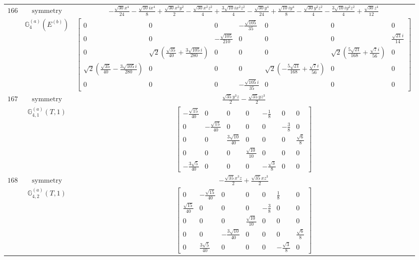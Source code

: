 \documentclass[fleqn,8pt,landscape]{jsarticle}
\begin{document}
\begin{longtable}{ccc}
$ 166 $ & $ \text{symmetry} $ & $ - \frac{\sqrt{30} x^{4}}{24} - \frac{\sqrt{10} i x^{4}}{8} + \frac{\sqrt{30} x^{2} y^{2}}{2} - \frac{\sqrt{30} x^{2} z^{2}}{4} + \frac{3 \sqrt{10} i x^{2} z^{2}}{4} - \frac{\sqrt{30} y^{4}}{24} + \frac{\sqrt{10} i y^{4}}{8} - \frac{\sqrt{30} y^{2} z^{2}}{4} - \frac{3 \sqrt{10} i y^{2} z^{2}}{4} + \frac{\sqrt{30} z^{4}}{12} $ \\
$  $ & $ \mathbb{G}_{4}^{(a)}(E^{(b)}) $ & $ \begin{bmatrix} 0 & 0 & 0 & - \frac{\sqrt{105}}{35} & 0 & 0 & 0 \\ 0 & 0 & - \frac{\sqrt{105}}{210} & 0 & 0 & 0 & \frac{\sqrt{21} i}{14} \\ 0 & \sqrt{2} \left(\frac{\sqrt{35}}{40} + \frac{3 \sqrt{105} i}{280}\right) & 0 & 0 & 0 & \sqrt{2} \left(\frac{5 \sqrt{21}}{168} + \frac{\sqrt{7} i}{56}\right) & 0 \\ \sqrt{2} \left(\frac{\sqrt{35}}{40} - \frac{3 \sqrt{105} i}{280}\right) & 0 & 0 & 0 & \sqrt{2} \left(- \frac{5 \sqrt{21}}{168} + \frac{\sqrt{7} i}{56}\right) & 0 & 0 \\ 0 & 0 & 0 & - \frac{\sqrt{105} i}{35} & 0 & 0 & 0 \end{bmatrix} $ \\ \hline
$ 167 $ & $ \text{symmetry} $ & $ \frac{\sqrt{35} y^{3} z}{2} - \frac{\sqrt{35} y z^{3}}{2} $ \\
$  $ & $ \mathbb{G}_{4,1}^{(a)}(T,1) $ & $ \begin{bmatrix} - \frac{\sqrt{15}}{40} & 0 & 0 & 0 & - \frac{1}{8} & 0 & 0 \\ 0 & - \frac{\sqrt{15}}{40} & 0 & 0 & 0 & - \frac{3}{8} & 0 \\ 0 & 0 & \frac{3 \sqrt{10}}{40} & 0 & 0 & 0 & \frac{\sqrt{6}}{8} \\ 0 & 0 & 0 & \frac{\sqrt{10}}{10} & 0 & 0 & 0 \\ - \frac{3 \sqrt{5}}{40} & 0 & 0 & 0 & - \frac{\sqrt{3}}{8} & 0 & 0 \end{bmatrix} $ \\ \hline
$ 168 $ & $ \text{symmetry} $ & $ - \frac{\sqrt{35} x^{3} z}{2} + \frac{\sqrt{35} x z^{3}}{2} $ \\
$  $ & $ \mathbb{G}_{4,2}^{(a)}(T,1) $ & $ \begin{bmatrix} 0 & - \frac{\sqrt{15}}{40} & 0 & 0 & 0 & \frac{1}{8} & 0 \\ \frac{\sqrt{15}}{40} & 0 & 0 & 0 & - \frac{3}{8} & 0 & 0 \\ 0 & 0 & 0 & \frac{\sqrt{10}}{10} & 0 & 0 & 0 \\ 0 & 0 & - \frac{3 \sqrt{10}}{40} & 0 & 0 & 0 & \frac{\sqrt{6}}{8} \\ 0 & \frac{3 \sqrt{5}}{40} & 0 & 0 & 0 & - \frac{\sqrt{3}}{8} & 0 \end{bmatrix} $ \\ \hline

\end{longtable}
\end{document}
